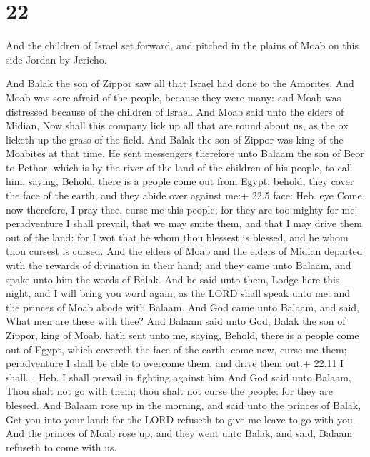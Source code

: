 \hypertarget{section-21}{%
\section{22}\label{section-21}}

 And the children of Israel set forward, and pitched in the
plains of Moab on this side Jordan by Jericho.

 And Balak the son of Zippor saw all that Israel had done
to the Amorites.  And Moab was sore afraid of the people,
because they were many: and Moab was distressed because of the children
of Israel.  And Moab said unto the elders of Midian, Now
shall this company lick up all that are round about us, as the ox
licketh up the grass of the field. And Balak the son of Zippor was king
of the Moabites at that time.  He sent messengers therefore
unto Balaam the son of Beor to Pethor, which is by the river of the land
of the children of his people, to call him, saying, Behold, there is a
people come out from Egypt: behold, they cover the face of the earth,
and they abide over against me:+ 22.5 face: Heb. eye  Come
now therefore, I pray thee, curse me this people; for they are too
mighty for me: peradventure I shall prevail, that we may smite them, and
that I may drive them out of the land: for I wot that he whom thou
blessest is blessed, and he whom thou cursest is cursed. 
And the elders of Moab and the elders of Midian departed with the
rewards of divination in their hand; and they came unto Balaam, and
spake unto him the words of Balak.  And he said unto them,
Lodge here this night, and I will bring you word again, as the LORD
shall speak unto me: and the princes of Moab abode with Balaam.
 And God came unto Balaam, and said, What men are these with
thee?  And Balaam said unto God, Balak the son of Zippor,
king of Moab, hath sent unto me, saying,  Behold, there is
a people come out of Egypt, which covereth the face of the earth: come
now, curse me them; peradventure I shall be able to overcome them, and
drive them out.+ 22.11 I shall\ldots: Heb. I shall prevail in fighting
against him  And God said unto Balaam, Thou shalt not go
with them; thou shalt not curse the people: for they are blessed.
 And Balaam rose up in the morning, and said unto the
princes of Balak, Get you into your land: for the LORD refuseth to give
me leave to go with you.  And the princes of Moab rose up,
and they went unto Balak, and said, Balaam refuseth to come with us.

